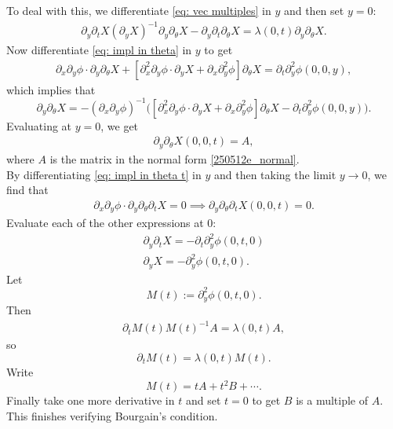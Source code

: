 \documentclass{article}
\numberwithin{equation}{section}
\theoremstyle{plain}
\begin{document}
To deal with this, we differentiate \eqref{eq: vec multiples} in $y$ and then set $y = 0$: 
\begin{align}\label{251003e10_42zz}
    \partial_y \partial_t X (\partial_y X)^{-1} \partial_y \partial_\theta X - \partial_y \partial_t \partial_\theta X = \lambda(0,t) \partial_y \partial_\theta X. 
\end{align}
Now differentiate \eqref{eq: impl in theta} in $y$ to get 
\begin{align}
    \partial_x \partial_y \phi \cdot \partial_y \partial_\theta X + [\partial_x^2 \partial_y \phi \cdot \partial_y X + \partial_x \partial_y^2 \phi] \partial_\theta X = \partial_t\partial^2_y\phi(0, 0, y),
\end{align}
which implies that 
\begin{equation}
    \partial_y \partial_\theta X = -(\partial_x \partial_y \phi)^{-1}\Big([\partial_x^2 \partial_y \phi \cdot \partial_y X + \partial_x \partial_y^2 \phi ] \partial_\theta X -\partial_t\partial^2_y\phi(0, 0, y)\Big).
\end{equation}
Evaluating at $y = 0$, we get 
\begin{align}
    \partial_y \partial_\theta X(0, 0, t) = A, 
\end{align}
where $A$ is the matrix in the normal form \eqref{250512e_normal}. \\


By differentiating \eqref{eq: impl in theta t} in $y$ and then taking the limit $y\to 0$, we  find that 
\begin{align}
    \partial_x \partial_y \phi \cdot \partial_y \partial_\theta \partial_t X = 0 \implies 
    \partial_y \partial_\theta \partial_t X(0, 0, t) = 0.
\end{align}
Evaluate each of the other expressions at 0:
\begin{align}
    \partial_y \partial_t X = -\partial_t \partial_y^2 \phi(0,t,0) \\
    \partial_y X = -\partial_y^2 \phi(0,t,0).
\end{align}
Let 
\begin{equation}
M(t) := \partial_y^2 \phi(0,t,0).
\end{equation}
 Then
\begin{align}
    \partial_t M(t) M(t)^{-1} A = \lambda(0,t) A,
\end{align}
so
\begin{equation}
\partial_t M(t) = \lambda(0,t) M(t).
\end{equation}
Write 
\begin{equation}
M(t) = tA + t^2B + \cdots.
\end{equation}
 Finally take one more derivative in $t$ and set $t=0$ to get $B$ is a multiple of $A$. This finishes verifying Bourgain's condition. 
\end{document}

